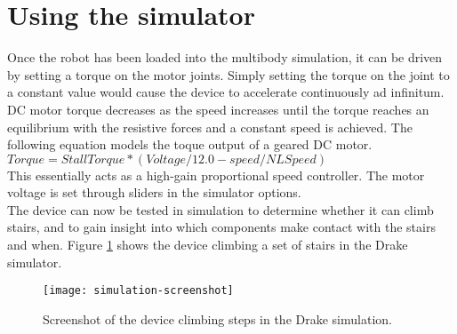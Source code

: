 \section{Using the simulator}
Once the robot has been loaded into the multibody simulation, it can be driven by setting a torque on the motor joints. Simply setting the torque on the joint to a constant value would cause the device to accelerate continuously ad infinitum. DC motor torque decreases as the speed increases until the torque reaches an equilibrium with the resistive forces and a constant speed is achieved. The following equation models the toque output of a geared DC motor.\\

$Torque = StallTorque*(Voltage/12.0-speed/NLSpeed)$\\

This essentially acts as a high-gain proportional speed controller. The motor voltage is set through sliders in the simulator options. \\
The device can now be tested in simulation to determine whether it can climb stairs, and to gain insight into which components make contact with the stairs and when. Figure \ref{fig:simulation-screenshot} shows the device climbing a set of stairs in the Drake simulator.\\

\begin{figure}[h]
	\centering
	\texttt{[image: simulation-screenshot]}
	\caption{Screenshot of the device climbing steps in the Drake simulation.}
	\label{fig:simulation-screenshot}
\end{figure}